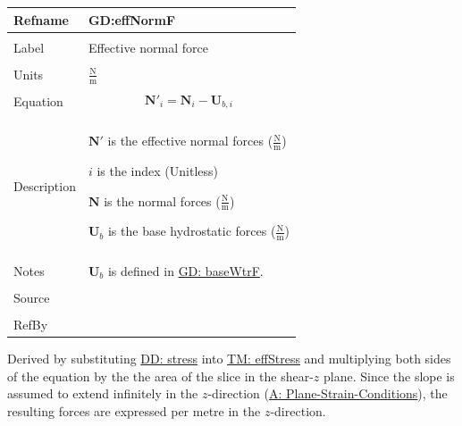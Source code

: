 \documentclass[12pt]{article}
\begin{document}
\noindent \begin{minipage}{\textwidth}
\begin{tabular}{p{} p{}}
\toprule \textbf{Refname} & \textbf{GD:effNormF}
\label{GD:effNormF}
\\ \midrule \\
Label & Effective normal force
\\ \midrule \\
Units & $\frac{\text{N}}{\text{m}}$
\\ \midrule \\
Equation & \begin{displaymath}
           {\mathbf{N'}}_{i}={\mathbf{N}}_{i}-{\mathbf{U}_{b,i}}
           \end{displaymath}
\\ \midrule \\
Description & \begin{symbDescription}
              \item{$\mathbf{N'}$ is the effective normal forces ($\frac{\text{N}}{\text{m}}$)}
              \item{$i$ is the index (Unitless)}
              \item{$\mathbf{N}$ is the normal forces ($\frac{\text{N}}{\text{m}}$)}
              \item{${\mathbf{U}_{b}}$ is the base hydrostatic forces ($\frac{\text{N}}{\text{m}}$)}
              \end{symbDescription}
\\ \midrule \\
Notes & ${\mathbf{U}_{b}}$ is defined in \hyperref[GD:baseWtrF]{GD: baseWtrF}.
\\ \midrule \\
Source & \cite{chen2005}
\\ \midrule \\
RefBy & 
\\ \bottomrule \end{tabular}
\end{minipage}
Derived by substituting \hyperref[DD:stress]{DD: stress} into \hyperref[TM:effStress]{TM: effStress} and multiplying both sides of the equation by the the area of the slice in the shear-$z$ plane. Since the slope is assumed to extend infinitely in the $z$-direction (\hyperref[assumpPSC]{A: Plane-Strain-Conditions}), the resulting forces are expressed per metre in the $z$-direction.
\par~
\end{document}
